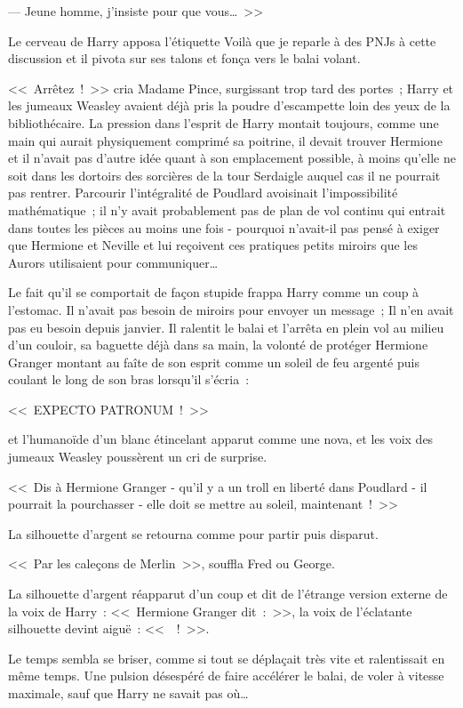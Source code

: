 --- Jeune homme, j'insiste pour que vous…~>>

Le cerveau de Harry apposa l'étiquette Voilà que je reparle à des PNJs à cette discussion et il pivota sur ses talons et fonça vers le balai volant.

<<~Arrêtez~!~>> cria Madame Pince, surgissant trop tard des portes~; Harry et les jumeaux Weasley avaient déjà pris la poudre d'escampette loin des yeux de la bibliothécaire. La pression dans l'esprit de Harry montait toujours, comme une main qui aurait physiquement comprimé sa poitrine, il devait trouver Hermione et il n'avait pas d'autre idée quant à son emplacement possible, à moins qu'elle ne soit dans les dortoirs des sorcières de la tour Serdaigle auquel cas il ne pourrait pas rentrer. Parcourir l'intégralité de Poudlard avoisinait l'impossibilité mathématique~; il n'y avait probablement pas de plan de vol continu qui entrait dans toutes les pièces au moins une fois - pourquoi n'avait-il pas pensé à exiger que Hermione et Neville et lui reçoivent ces pratiques petits miroirs que les Aurors utilisaient pour communiquer…

Le fait qu'il se comportait de façon stupide frappa Harry comme un coup à l'estomac. Il n'avait pas besoin de miroirs pour envoyer un message~; Il n'en avait pas eu besoin depuis janvier. Il ralentit le balai et l'arrêta en plein vol au milieu d'un couloir, sa baguette déjà dans sa main, la volonté de protéger Hermione Granger montant au faîte de son esprit comme un soleil de feu argenté puis coulant le long de son bras lorsqu'il s'écria~:

<<~EXPECTO PATRONUM~!~>>

et l'humanoïde d'un blanc étincelant apparut comme une nova, et les voix des jumeaux Weasley poussèrent un cri de surprise.

<<~Dis à Hermione Granger - qu'il y a un troll en liberté dans Poudlard - il pourrait la pourchasser - elle doit se mettre au soleil, maintenant~!~>>

La silhouette d'argent se retourna comme pour partir puis disparut.

<<~Par les caleçons de Merlin~>>, souffla Fred ou George.

La silhouette d'argent réapparut d'un coup et dit de l'étrange version externe de la voix de Harry~: <<~Hermione Granger dit~:~>>, la voix de l'éclatante silhouette devint aiguë~: <<~~!~>>.

Le temps sembla se briser, comme si tout se déplaçait très vite et ralentissait en même temps. Une pulsion désespéré de faire accélérer le balai, de voler à vitesse maximale, sauf que Harry ne savait pas où…

